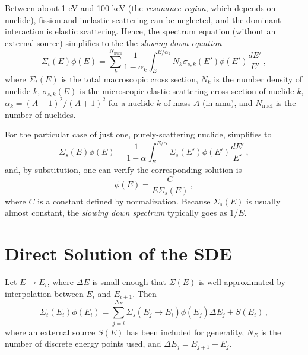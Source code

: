 Between about 1 eV and 100 keV (the \emph{resonance region}, which 
depends on nuclide),  fission 
and inelastic scattering can be neglected, and the dominant 
interaction is elastic scattering.  Hence, the spectrum
equation (without an external source) simplifies to the 
the \emph{slowing-down equation}
\begin{equation}
     \Sigma_t (E) \phi(E) = 
       \sum^{N_{\text{nucl}}}_{k} \frac{1}{1-\alpha_k} 
          \int^{E/\alpha_k}_E N_k \sigma_{s,k} (E') \phi(E') \frac{dE'}{E'} \, ,
\label{eq:sde_general}
\end{equation}
where $\Sigma_t(E)$ is the total macroscopic cross section, $N_k$ is 
the number density of nuclide $k$,  $\sigma_{s,k}(E)$ is the microscopic
elastic scattering cross section of nuclide $k$, 
$\alpha_k = (A-1)^2/(A+1)^2$ for a nuclide $k$ of mass $A$ (in amu), 
and $N_{\text{nucl}}$ is the number of nuclides.
    
For the particular case of just one, purely-scattering nuclide, 
 simplifies to
\begin{equation}
     \Sigma_s (E) \phi(E) = 
       \frac{1}{1-\alpha} 
          \int^{E/\alpha}_E \Sigma_{s} (E') \phi(E') \frac{dE'}{E'} \, ,
    \label{eq:sde_one_nuclide}
\end{equation}
and, by substitution, one can verify the corresponding solution
is
\begin{equation}
     \phi(E) = \frac{C}{E\Sigma_s (E)} \, ,
\end{equation}
where $C$ is a constant defined by normalization.  Because 
$\Sigma_s(E)$ is usually almost constant, the 
\emph{slowing down spectrum} typically goes as $1/E$.
    
\section*{Direct Solution of the SDE}

Let $E\to E_i$, where $\Delta E$ is small enough 
that $\Sigma(E)$ is well-approximated by interpolation
between $E_i$ and $E_{i+1}$.  Then
\begin{equation}
     \Sigma_t (E_i) \phi(E_i) = 
       \sum_{j=i}^{N_E} \Sigma_s (E_j \to E_i) \phi(E_j) \Delta E_j
         + S(E_i) \, ,
    \label{eq:sde_discretized}
\end{equation}   
where an external source $S(E)$ has been included for generality,
$N_E$ is the number of discrete energy points used, and 
$\Delta E_j = E_{j+1} - E_{j}$.

